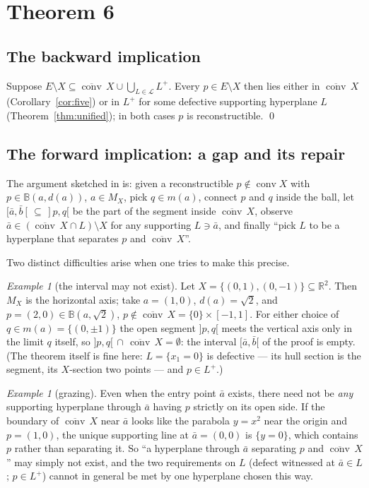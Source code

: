 \documentclass[11pt]{article}
\theoremstyle{remark}
\newtheorem{example}[theorem]{Example}
\newcommand{\R}{\mathbb{R}}
\newcommand{\B}{\mathbb{B}}
\newcommand{\X}{X}
\newcommand{\conv}{\operatorname{conv}}
\newcommand{\cconv}[1]{\overline{\conv}\,#1}
\newcommand{\Mx}{M_{\X}}
\begin{document}
\section{Theorem 6}\label{sec:thm6}

\subsection{The backward implication}

Suppose $E\setminus \X\subseteq\cconv\X\cup\bigcup_{L\in\mathcal L}L^{+}$. Every
$p\in E\setminus\X$ then lies either in $\cconv \X$ (Corollary~\ref{cor:five}) or in $L^{+}$ for
some defective supporting hyperplane $L$ (Theorem~\ref{thm:unified}); in both cases $p$ is
reconstructible. \qed

\subsection{The forward implication: a gap and its repair}\label{sec:forward}

The argument sketched in \cite{Bia} is: given a reconstructible $p\notin\conv \X$ with
$p\in\B(a,d(a))$, $a\in\Mx$, pick $q\in m(a)$, connect $p$ and $q$ inside the ball, let
$[\bar a,\bar b[\,\subseteq\,]p,q[$ be the part of the segment inside $\cconv \X$, observe
$\bar a\in(\cconv\X\cap L)\setminus \X$ for any supporting $L\ni\bar a$, and finally ``pick $L$
to be a hyperplane that separates $p$ and $\cconv\X$''.

Two distinct difficulties arise when one tries to make this precise.

\begin{example}[the interval may not exist]\label{ex:twopoints}
Let $\X=\{(0,1),(0,-1)\}\subseteq\R^2$. Then $\Mx$ is the horizontal axis; take $a=(1,0)$,
$d(a)=\sqrt2$, and $p=(2,0)\in\B(a,\sqrt2)$, $p\notin\cconv\X=\{0\}\times[-1,1]$. For either
choice of $q\in m(a)=\{(0,\pm1)\}$ the open segment $]p,q[$ meets the vertical axis only in the
limit $q$ itself, so $]p,q[\,\cap\,\cconv\X=\emptyset$: the interval $[\bar a,\bar b[$ of the
proof is empty. (The theorem itself is fine here: $L=\{x_1=0\}$ is defective --- its hull section
is the segment, its $\X$-section two points --- and $p\in L^{+}$.)
\end{example}

\begin{example}[grazing]\label{ex:grazing}
Even when the entry point $\bar a$ exists, there need not be \emph{any} supporting hyperplane
through $\bar a$ having $p$ strictly on its open side. If the boundary of $\cconv\X$ near
$\bar a$ looks like the parabola $y=x^2$ near the origin and $p=(1,0)$, the unique supporting
line at $\bar a=(0,0)$ is $\{y=0\}$, which contains $p$ rather than separating it. So
``a hyperplane through $\bar a$ separating $p$ and $\cconv \X$'' may simply not exist, and the
two requirements on $L$ (defect witnessed at $\bar a\in L$; $p\in L^{+}$) cannot in general be
met by one hyperplane chosen this way.
\end{example}
\end{document}
